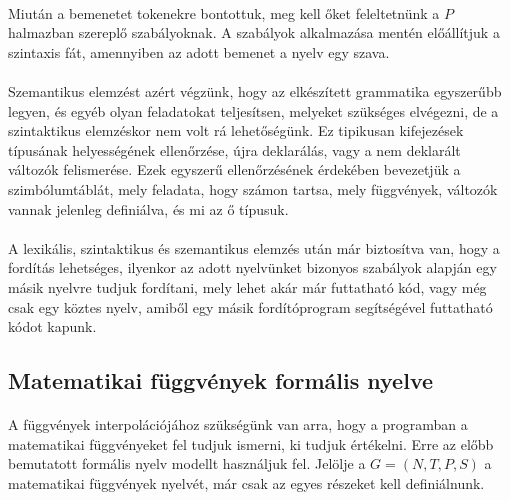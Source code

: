 \documentclass[12pt]{report}
\begin{document}
\paragraph{}
Miután a bemenetet tokenekre bontottuk, meg kell őket feleltetnünk a $P$ halmazban szereplő szabályoknak. A szabályok alkalmazása mentén előállítjuk a szintaxis fát, amennyiben az adott bemenet a nyelv egy szava.
\paragraph{}
Szemantikus elemzést azért végzünk, hogy az elkészített grammatika egyszerűbb legyen, és egyéb olyan feladatokat teljesítsen, melyeket szükséges elvégezni, de a szintaktikus elemzéskor nem volt rá lehetőségünk. Ez tipikusan kifejezések típusának helyességének ellenőrzése, újra deklarálás, vagy a nem deklarált változók felismerése. Ezek egyszerű ellenőrzésének érdekében bevezetjük a szimbólumtáblát, mely feladata, hogy számon tartsa, mely függvények, változók vannak jelenleg definiálva, és mi az ő típusuk.
\paragraph{}
A lexikális, szintaktikus és szemantikus elemzés után már biztosítva van, hogy a fordítás lehetséges, ilyenkor az adott nyelvünket bizonyos szabályok alapján egy másik nyelvre tudjuk fordítani, mely lehet akár már futtatható kód, vagy még csak egy köztes nyelv, amiből egy másik fordítóprogram segítségével futtatható kódot kapunk.

\subsection{Matematikai függvények formális nyelve}
\paragraph{}
A függvények interpolációjához szükségünk van arra, hogy a programban a matematikai függvényeket fel tudjuk ismerni, ki tudjuk értékelni. Erre az előbb bemutatott formális nyelv modellt használjuk fel. Jelölje a $G=(N, T, P, S)$ a matematikai függvények nyelvét, már csak az egyes részeket kell definiálnunk.
\end{document}
